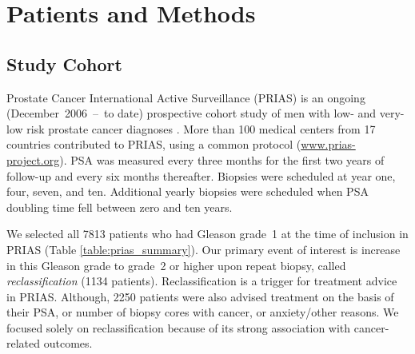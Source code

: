 \section{Patients and Methods}

\subsection{Study Cohort}
\label{subsec:cohort}
Prostate Cancer International Active Surveillance (PRIAS) is an ongoing (December~2006~--~to date) prospective cohort study of men with low- and very-low risk prostate cancer diagnoses \cite{bul2013active}. More than 100 medical centers from 17 countries contributed to PRIAS, using a common protocol (\url{www.prias-project.org}). PSA was measured every three months for the first two years of follow-up and every six months thereafter. Biopsies were scheduled at year one, four, seven, and ten. Additional yearly biopsies were scheduled when PSA doubling time fell between zero and ten years.

We selected all 7813 patients who had Gleason grade~1 \citep{epsteinGG2014} at the time of inclusion in PRIAS (Table \ref{table:prias_summary}). Our primary event of interest is increase in this Gleason grade to grade~2 or higher upon repeat biopsy, called \textit{reclassification} (1134 patients). Reclassification is a trigger for treatment advice in PRIAS. Although, 2250 patients were also advised treatment on the basis of their PSA, or number of biopsy cores with cancer, or anxiety/other reasons. We focused solely on reclassification because of its strong association with cancer-related outcomes.

